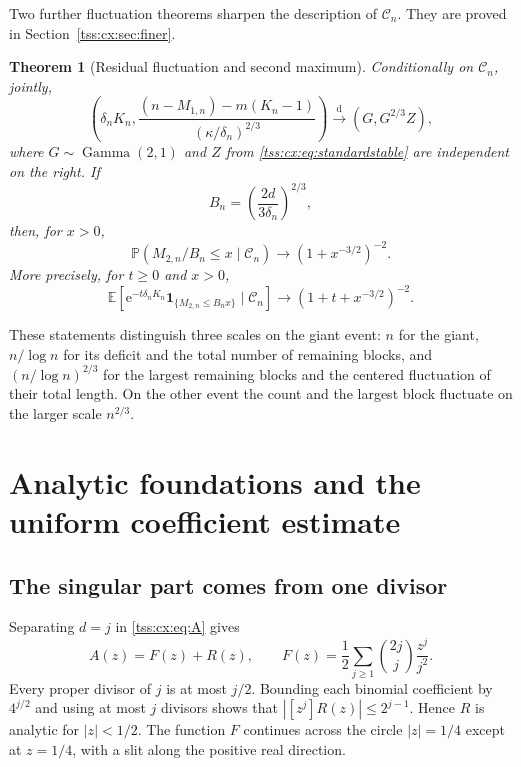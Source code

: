\documentclass[11pt]{article}
\newtheorem{theorem}{Theorem}[section]
\theoremstyle{remark}\newtheorem{remark}[theorem]{Remark}
\theoremstyle{definition}\newtheorem{definition}[theorem]{Definition}
\newcommand{\e}{\mathrm e}
\newcommand{\E}{\mathbb E}
\newcommand{\Prob}{\mathbb P}
\newcommand{\ind}{\mathbf 1}
\newcommand{\dto}{\xrightarrow{\mathrm d}}
\newcommand{\Cev}{\mathcal C_n}
\begin{document}
Two further fluctuation theorems sharpen the description of $\Cev$.
They are proved in Section~\ref{tss:cx:sec:finer}.
\begin{theorem}[Residual fluctuation and second maximum]\label{tss:cx:thm:finer}
Conditionally on $\Cev$, jointly,
\begin{equation}\label{tss:cx:eq:residualstable}
 \left(\delta_nK_n,
 \frac{(n-M_{1,n})-m(K_n-1)}{(\kappa/\delta_n)^{2/3}}\right)
 \dto (G,G^{2/3}Z),
\end{equation}
where $G\sim\operatorname{Gamma}(2,1)$ and $Z$ from
\eqref{tss:cx:eq:standardstable} are independent on the right.
If
\begin{equation}\label{tss:cx:eq:Bscale}
 B_n=\left(\frac{2d}{3\delta_n}\right)^{2/3},
\end{equation}
then, for $x>0$,
\begin{equation}\label{tss:cx:eq:secondmax}
 \Prob(M_{2,n}/B_n\le x\mid\Cev)
 \longrightarrow (1+x^{-3/2})^{-2}.
\end{equation}
More precisely, for $t\ge0$ and $x>0$,
\begin{equation}\label{tss:cx:eq:jointmax}
 \E\left[\e^{-t\delta_nK_n}
       \ind_{\{M_{2,n}\le B_nx\}}\mid\Cev\right]
 \longrightarrow(1+t+x^{-3/2})^{-2}.
\end{equation}
\end{theorem}

These statements distinguish three scales on the giant event:
$n$ for the giant, $n/\log n$ for its deficit and the total number
of remaining blocks, and $(n/\log n)^{2/3}$ for the largest remaining
blocks and the centered fluctuation of their total length.
On the other event the count and the largest block fluctuate on
the larger scale $n^{2/3}$.

\section{Analytic foundations and the uniform coefficient estimate}
\label{tss:cx:sec:coefficient}

\subsection{The singular part comes from one divisor}
Separating $d=j$ in \eqref{tss:cx:eq:A} gives
\begin{equation}\label{tss:cx:eq:split}
 A(z)=F(z)+R(z),\qquad
 F(z)=\frac12\sum_{j\ge1}\binom{2j}{j}\frac{z^j}{j^2}.
\end{equation}
Every proper divisor of $j$ is at most $j/2$. Bounding each binomial
coefficient by $4^{j/2}$ and using at most $j$ divisors shows that
$|[z^j]R(z)|\le2^{j-1}$. Hence $R$ is analytic for $|z|<1/2$.
The function $F$ continues across the circle $|z|=1/4$ except at
$z=1/4$, with a slit along the positive real direction.
\end{document}
